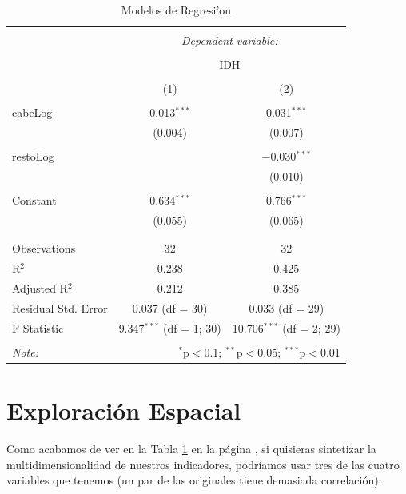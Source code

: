 \documentclass{article}
\begin{document}
\begin{table}[!htbp] \centering 
  \caption{Modelos de Regresi'on} 
  \label{regresiones} 
\begin{tabular}{@{\extracolsep{5pt}}lcc} 
\\[-1.8ex]\hline 
\hline \\[-1.8ex] 
 & \multicolumn{2}{c}{\textit{Dependent variable:}} \\ 
\cline{2-3} 
\\[-1.8ex] & \multicolumn{2}{c}{IDH} \\ 
\\[-1.8ex] & (1) & (2)\\ 
\hline \\[-1.8ex] 
 cabeLog & 0.013$^{***}$ & 0.031$^{***}$ \\ 
  & (0.004) & (0.007) \\ 
  & & \\ 
 restoLog &  & $-$0.030$^{***}$ \\ 
  &  & (0.010) \\ 
  & & \\ 
 Constant & 0.634$^{***}$ & 0.766$^{***}$ \\ 
  & (0.055) & (0.065) \\ 
  & & \\ 
\hline \\[-1.8ex] 
Observations & 32 & 32 \\ 
R$^{2}$ & 0.238 & 0.425 \\ 
Adjusted R$^{2}$ & 0.212 & 0.385 \\ 
Residual Std. Error & 0.037 (df = 30) & 0.033 (df = 29) \\ 
F Statistic & 9.347$^{***}$ (df = 1; 30) & 10.706$^{***}$ (df = 2; 29) \\ 
\hline 
\hline \\[-1.8ex] 
\textit{Note:}  & \multicolumn{2}{r}{$^{*}$p$<$0.1; $^{**}$p$<$0.05; $^{***}$p$<$0.01} \\ 
\end{tabular} 
\end{table} \clearpage

\section{Exploraci\'on Espacial}

Como acabamos de ver en la Tabla \ref{regresiones} en la p\'agina \pageref{regresiones}, si quisieras sintetizar la multidimensionalidad de nuestros indicadores, podr\'iamos usar tres de las cuatro variables que tenemos (un par de las originales tiene demasiada correlaci\'on). 
\end{document}
